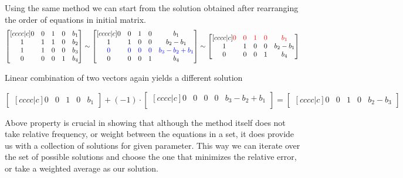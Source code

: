 Using the same method we can start from the solution obtained after rearranging the order of equations in initial matrix.
\begin{equation}
\begin{bmatrix}[cccc|c]
    0 & 0 & 1 & 0 & b_1 \\
    1 & 1 & 1 & 0 & b_2 \\ 
    1 & 1 & 0 & 0 & b_3 \\ 
    0 & 0 & 0 & 1 & b_4 \\ 
\end{bmatrix}
\sim
\begin{bmatrix}[cccc|c]
    0 & 0 & 1 & 0 & b_1 \\ 
    1 & 1 & 0 & 0 & b_2-b_1 \\ 
    \textcolor{blue}{0} & \textcolor{blue}{0} & \textcolor{blue}{0} & \textcolor{blue}{0} &\textcolor{blue}{b_3 - b_2 + b_1} \\ 
    0 & 0 & 0 & 1 & b_4
\end{bmatrix}
\sim
\begin{bmatrix}[cccc|c]
    \textcolor{red}{0} & \textcolor{red}{0} & \textcolor{red}{1} & \textcolor{red}{0} &\textcolor{red}{b_1} \\ 
    1 & 1 & 0 & 0 & b_2-b_1 \\ 
    0 & 0 & 0 & 1 & b_4
\end{bmatrix}
\end{equation}

Linear combination of two vectors again yields a different solution

\begin{equation}
\begin{bmatrix}[cccc|c]
    0 & 0 & 1 & 0 & b_1
\end{bmatrix}
+
(-1)\cdot
\begin{bmatrix}[cccc|c]
    0 & 0 & 0 & 0 & b_3 - b_2 + b_1 \\ 
\end{bmatrix}
=
\begin{bmatrix}[cccc|c]
    0 & 0 & 1 & 0 & b_2-b_3
\end{bmatrix}
\end{equation}

Above property is crucial in showing that although the method itself does not take relative frequency, or weight between the equations in a set, it does provide us with a collection of solutions for given parameter.
This way we can iterate over the set of possible solutions and choose the one that minimizes the relative error, or take a weighted average as our solution.

